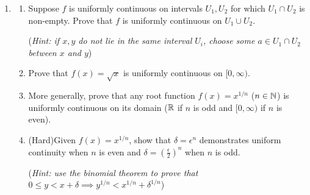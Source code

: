 \begin{exercises}{}{}
\begin{enumerate}
	  \item\label{exs:unifcontunion}\begin{enumerate}
	    \item Suppose $f$ is uniformly continuous on intervals $U_1,U_2$ for which $U_1\cap U_2$ is non-empty. Prove that $f$ is uniformly continuous on $U_1\cup U_2$.\par
	    (\emph{Hint: if $x,y$ do not lie in the same interval $U_i$, choose some $a\in U_1\cap U_2$ between $x$ and $y$})
	
			\item Prove that $f(x)=\sqrt x$ is uniformly continuous on $[0,\infty)$.
			
			\item More generally, prove that any root function $f(x)=x^{1/n}$ ($n\in\mathbb{N}$) is uniformly continuous on its domain ($\mathbb{R}$ if $n$ is odd and $[0,\infty)$ if $n$ is even).
			
			\item (Hard)\lstsp Given $f(x)=x^{1/n}$, show that $\delta=\epsilon^n$ demonstrates uniform continuity when $n$ is even and $\delta=\left(\frac\epsilon 2\right)^n$ when $n$ is odd.\par
			(\emph{Hint: use the binomial theorem to prove that $0\le y<x+\delta\implies y^{1/n}<x^{1/n}+\delta^{1/n}$})
		\end{enumerate}
	
	\end{enumerate}
\end{exercises}

\vspace{-15pt}


\fi